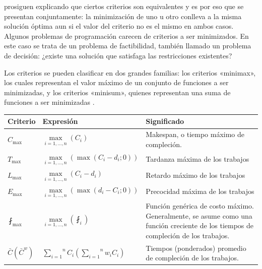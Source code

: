 \documentclass[spanish,draft,12pt,headsepline,footsepline,paper=letter]{scrreprt}
\begin{document}
\citet[p.~12,~13]{TKindt2002} prosiguen explicando que ciertos criterios son equivalentes y es por eso que se presentan conjuntamente: la minimización de uno u otro conlleva a la misma solución óptima aun si el valor del criterio no es el mismo en ambos casos. Algunos problemas de programación carecen de criterios a ser minimizados. En este caso se trata de un problema de factibilidad, también llamado un problema de decisión: ¿existe una solución que satisfaga las restricciones existentes?

Los criterios se pueden clasificar en dos grandes familias: los criterios «minimax», los cuales representan el valor máximo de un conjunto de funciones a ser minimizadas, y los criterios «minisum», quienes representan una suma de funciones a ser minimizadas \citep[p.~13]{TKindt2002}.

\begin{table}
\centering
\begin{tabular}{l l p{8cm}}
\toprule
\multicolumn{1}{l}{Criterio} & \multicolumn{1}{l}{Expresión} & \multicolumn{1}{l}{Significado} \\
  \midrule
  $C_{\max}$            & $\underset{i=1,\dots,n}{\max} (C_i)$                                             & Makespan, o tiempo máximo de compleción.                                                                                          \\[12pt]
  $T_{\max}$            & $\underset{i=1,\dots,n}{\max} (\max (C_i-d_i;0))$                                & Tardanza máxima de los trabajos                                                                                                   \\[12pt]
  $L_{\max}$            & $\underset{i=1,\dots,n}{\max} (C_i-d_i)$                                         & Retardo máximo de los trabajos                                                                                                    \\[12pt]
  $E_{\max}$            & $\underset{i=1,\dots,n}{\max} (\max(d_i-C_i;0))$                                 & Precocidad máxima de los trabajos                                                                                                 \\[12pt]
  $\fint_{\max}$        & $\underset{i=1,\dots,n}{\max} (\fint_i)$                                         & Función genérica de costo máximo. Generalmente, se asume como una función creciente de los tiempos de compleción de los trabajos. \\
  $\bar{C} (\bar{C}^w)$ & $\overset{n}{\underset{i=1}{\sum}}C_i (\overset{n}{\underset{i=1}{\sum}}w_iC_i)$ & Tiempos (ponderados) promedio de compleción de los trabajos.                                                                      \\

\end{tabular}
\end{table}
\end{document}
